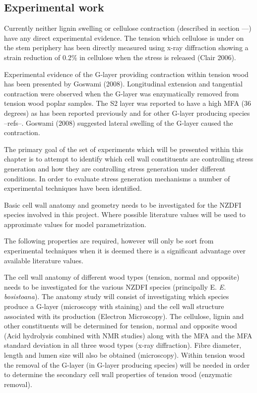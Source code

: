 \documentclass{article}
\begin{document}
\subsection{Experimental work}
Currently neither lignin swelling or cellulose contraction (described in section
---) have any direct experimental evidence. The tension which cellulose is under
on the stem periphery has been directly measured using x-ray diffraction showing
a strain reduction of 0.2\% in cellulose when the stress is released (Clair
2006).

Experimental evidence of the G-layer providing contraction within tension wood
has been presented by Goswami (2008). Longitudinal extension and tangential
contraction were observed when the G-layer was enzymatically removed from
tension wood poplar samples. The S2 layer was reported to have a high MFA (36
degrees) as has been reported previously and for other G-layer producing species
--refs--. Goswami (2008) suggested lateral swelling of the G-layer caused the
contraction.

The primary goal of the set of experiments which will be presented within this
chapter is to attempt to identify which cell wall constituents are controlling
stress generation and how they are controlling stress generation under different
conditions. In order to evaluate stress generation mechanisms a number of
experimental techniques have been identified.

Basic cell wall anatomy and geometry needs to be investigated for the NZDFI
species involved in this project. Where possible literature values will be used
to approximate values for model parametrization.

The following properties are required, however will only be sort from
experimental techniques when it is deemed there is a significant advantage over
available literature values.

The cell wall anatomy of different wood types (tension, normal and opposite)
needs to be investigated for the various NZDFI species (principally E.
\textit{E. bosistoana}). The anatomy study will consist of investigating which species
produce a G-layer (microscopy with staining) and the cell wall structure
associated with its production (Electron Microscopy). The cellulose, lignin and
other constituents will be determined for tension, normal and opposite wood
(Acid hydrolysis combined with NMR studies) along with the MFA and the MFA
standard deviation in all three wood types (x-ray diffraction). Fibre diameter,
length and lumen size will also be obtained (microscopy). Within tension wood
the removal of the G-layer (in G-layer producing species) will be needed in
order to determine the secondary cell wall properties of tension wood (enzymatic
removal).
\end{document}
